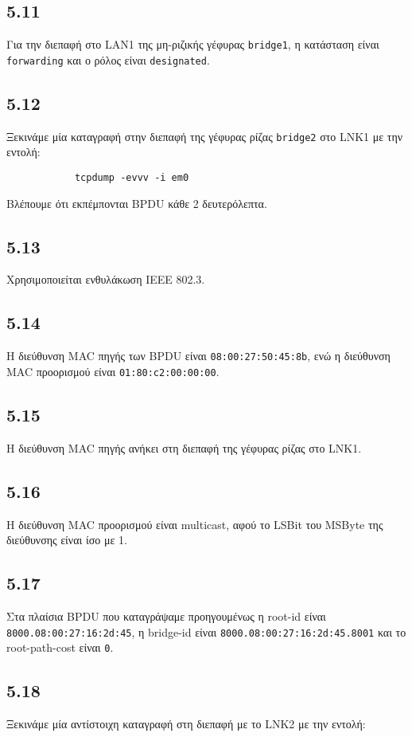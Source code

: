 \documentclass[a4paper, 12pt]{article}
\begin{document}
	\subsection*{5.11}
		Για την διεπαφή στο LAN1 της μη-ριζικής γέφυρας \verb|bridge1|, η κατάσταση είναι \verb|forwarding| και ο ρόλος είναι \verb|designated|.

	\subsection*{5.12}
		Ξεκινάμε μία καταγραφή στην διεπαφή της γέφυρας ρίζας \verb|bridge2| στο LNK1 με την εντολή:
		
		\begin{verbatim}
			tcpdump -evvv -i em0
		\end{verbatim}

		Βλέπουμε ότι εκπέμπονται BPDU κάθε 2 δευτερόλεπτα.
		
	\subsection*{5.13}
		Χρησιμοποιείται ενθυλάκωση IEEE 802.3.

	\subsection*{5.14}
		Η διεύθυνση MAC πηγής των BPDU είναι \verb|08:00:27:50:45:8b|, ενώ η διεύθυνση MAC προορισμού είναι \verb|01:80:c2:00:00:00|.

	\subsection*{5.15}
		Η διεύθυνση MAC πηγής ανήκει στη διεπαφή της γέφυρας ρίζας στο LNK1.

	\subsection*{5.16}
		Η διεύθυνση MAC προορισμού είναι multicast, αφού το LSBit του MSByte της διεύθυνσης είναι ίσο με 1.

	\subsection*{5.17}
		Στα πλαίσια BPDU που καταγράψαμε προηγουμένως η root-id είναι \verb|8000.08:00:27:16:2d:45|, η bridge-id είναι \verb|8000.08:00:27:16:2d:45.8001| και το root-path-cost είναι \verb|0|.
		
	\subsection*{5.18}
		Ξεκινάμε μία αντίστοιχη καταγραφή στη διεπαφή με το LNK2 με την εντολή:
		
\end{document}
